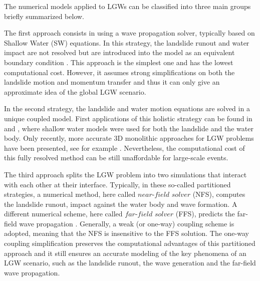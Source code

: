 The numerical models applied to LGWs can be classified into three main groups \cite{yavari2016numerical} briefly summarized below.

The first approach consists in using a wave propagation solver, typically based on Shallow Water (SW) equations. In this strategy, the landslide runout and water impact are not resolved but are introduced into the model as an equivalent boundary condition \cite{waythomas2003numerical, ataie2008mapping}. This approach is the simplest one and has the lowest computational cost. However, it assumes strong simplifications on both the landslide motion and momentum transfer and thus it can only give an approximate idea of the global LGW scenario.

In the second strategy, the landslide and water motion equations are solved in a unique coupled model. First applications of this holistic strategy can be found in \cite{kelfoun2010landslide} and \cite{giachetti2011numerical}, where shallow water models were used for both the landslide and the water body.
Only recently, more accurate 3D monolithic approaches for LGW problems have been presented, see for example
\cite{vacondio20133d, CrostaVajont, franci20203dA, franci20203dB, xu2021sph, terada2021}. Nevertheless, the computational cost of this fully resolved method can be still unaffordable for large-scale events.

The third approach splits the LGW problem into two simulations that interact with each other at their interface. Typically, in these so-called partitioned strategies, a numerical method, here called $near$-$field$ $solver$ (NFS), computes the landslide runout, impact against the water body and wave formation. A different numerical scheme, here called $far$-$field$ $solver$ (FFS), predicts the far-field wave propagation \cite{yavari2016numerical}.
Generally, a weak (or one-way) coupling scheme is adopted, meaning that the NFS is insensitive to the FFS solution. The one-way coupling simplification preserves the computational advantages of this partitioned approach and it still ensures an accurate modeling of the key phenomena of an LGW scenario, such as the landslide runout, the wave generation and the far-field wave propagation.
 
